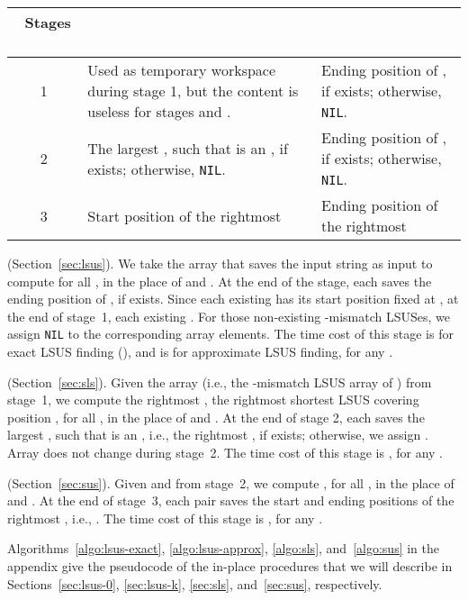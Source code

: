 \documentclass[11pt]{llncs}
\begin{document}
\begin{center}
    \begin{tabular}{||c|m{7.5cm}|m{6.5cm}||}
      \hline
      \ Stages \ & \hspace*{30mm}  & \hspace*{30mm} \\
      \hline\hline
      1 & Used as temporary workspace during stage 1, but the content
      is useless for stages  and . & Ending position of , if  exists; otherwise, {\tt NIL}.\\
      \hline
      2  & The largest , such that  is 
           an , if  exists;
      otherwise, {\tt NIL}.
      & Ending position of , if  exists; otherwise, {\tt NIL}. \\
      \hline
      3  & Start position of the rightmost  & Ending
      position of the rightmost \\
      \hline
   \end{tabular}
\end{center}




 (Section~\ref{sec:lsus}). We take the array
 that saves the input string as input to compute  for
all , in the place of  and . At the end of the stage, each
 saves the ending position of , if  exists. Since each existing
 has its start position fixed at , at the end of
stage~1, each existing .
For those non-existing -mismatch LSUSes, we assign {\tt NIL} to the
corresponding  array elements. The time cost of this stage is
 for exact LSUS finding (), and is  for approximate
LSUS finding, for any .

\medskip 
{} (Section~\ref{sec:sls}). Given the array 
(i.e., the -mismatch LSUS array of ) from stage~1, we compute
the rightmost , the rightmost shortest LSUS covering
position , for all , in the place of  and . At the end of
stage 2, each  saves the largest , such that  is
an , i.e., the rightmost , if  exists; otherwise, we assign . Array  does not change during stage~2. The time cost of
this stage is , for any .

\medskip 
{} (Section~\ref{sec:sus}).  Given 
and  from stage~2,
we compute , for all , in the place of  and . At
the end of stage~3, each  pair saves the start and ending
positions of the rightmost , i.e., . The time cost of this stage is ,
for any .

\medskip 

Algorithms~\ref{algo:lsus-exact}, \ref{algo:lsus-approx}, 
\ref{algo:sls}, and~\ref{algo:sus} 
in the appendix give the pseudocode of the
in-place procedures that we will describe in 
Sections~\ref{sec:lsus-0}, \ref{sec:lsus-k},
\ref{sec:sls}, and~\ref{sec:sus}, respectively.
\end{document}
